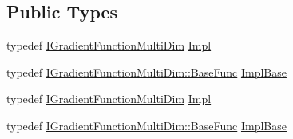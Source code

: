 \subsection*{Public Types}
\begin{DoxyCompactItemize}
\item 
typedef \mbox{\hyperlink{classROOT_1_1Math_1_1IGradientFunctionMultiDim}{I\+Gradient\+Function\+Multi\+Dim}} \mbox{\hyperlink{classROOT_1_1Math_1_1GradFunctor_a4ce94e1b525d38a2d7da3c88ace6e0f9}{Impl}}
\item 
typedef \mbox{\hyperlink{classROOT_1_1Math_1_1IGradientFunctionMultiDim_a803074495bafb5acf9f130b648001609}{I\+Gradient\+Function\+Multi\+Dim\+::\+Base\+Func}} \mbox{\hyperlink{classROOT_1_1Math_1_1GradFunctor_a1fb9161fc93c7e7fa185dddbcc2c4f4d}{Impl\+Base}}
\item 
typedef \mbox{\hyperlink{classROOT_1_1Math_1_1IGradientFunctionMultiDim}{I\+Gradient\+Function\+Multi\+Dim}} \mbox{\hyperlink{classROOT_1_1Math_1_1GradFunctor_a4ce94e1b525d38a2d7da3c88ace6e0f9}{Impl}}
\item 
typedef \mbox{\hyperlink{classROOT_1_1Math_1_1IGradientFunctionMultiDim_a803074495bafb5acf9f130b648001609}{I\+Gradient\+Function\+Multi\+Dim\+::\+Base\+Func}} \mbox{\hyperlink{classROOT_1_1Math_1_1GradFunctor_a1fb9161fc93c7e7fa185dddbcc2c4f4d}{Impl\+Base}}
\end{DoxyCompactItemize}
